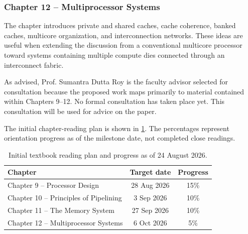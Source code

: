 \subsubsection{Chapter 12 -- Multiprocessor Systems}

The chapter introduces private and shared caches, cache coherence, banked caches, multicore organization, and interconnection networks. These ideas are useful when extending the discussion from a conventional multicore processor toward systems containing multiple compute dies connected through an interconnect fabric.

As advised, Prof. Sumantra Dutta Roy is the faculty advisor selected for consultation because the proposed work maps primarily to material contained within Chapters 9--12. No formal consultation has taken place yet. This consultation will be used for advice on the paper.

The initial chapter-reading plan is shown in \cref{tab:chapter-plan}. The percentages represent orientation progress as of the milestone date, not completed close readings.

\begin{table}[htbp]
  \centering
  \caption{Initial textbook reading plan and progress as of 24 August 2026.}
  \label{tab:chapter-plan}
  \begin{tabular}{p{} c c}
    \toprule
    Chapter & Target date & Progress\\
    \midrule
    Chapter 9 -- Processor Design & 28 Aug 2026 & 15\%\\
    Chapter 10 -- Principles of Pipelining & 3 Sep 2026 & 10\%\\
    Chapter 11 -- The Memory System & 27 Sep 2026 & 10\%\\
    Chapter 12 -- Multiprocessor Systems & 6 Oct 2026 & 5\%\\
    \bottomrule
  \end{tabular}
\end{table}

\FloatBarrier
